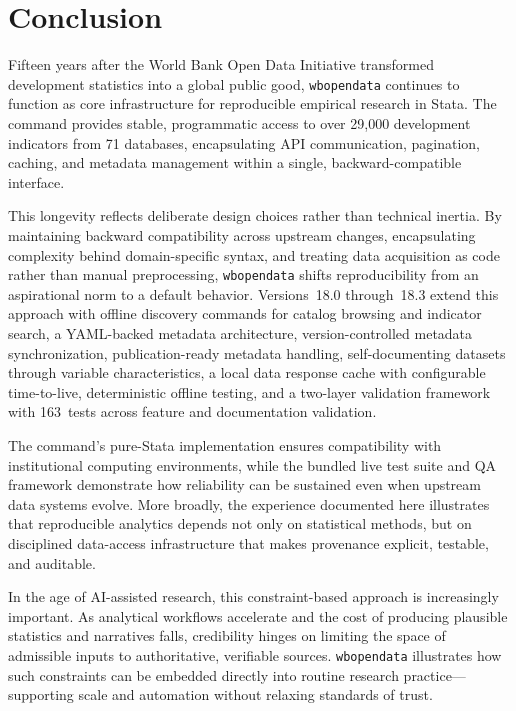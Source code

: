 \documentclass[bib]{statapress}
\begin{document}
\section{Conclusion}\label{sec:conclusion}

Fifteen years after the World Bank Open Data Initiative transformed development
statistics into a global public good, \texttt{wbopendata} continues to function
as core infrastructure for reproducible empirical research in Stata. The command
provides stable, programmatic access to over 29{,}000 development indicators from
71 databases, encapsulating API communication, pagination, caching, and metadata
management within a single, backward-compatible interface.

This longevity reflects deliberate design choices rather than technical inertia.
By maintaining backward compatibility across upstream changes, encapsulating
complexity behind domain-specific syntax, and treating data acquisition as code
rather than manual preprocessing, \texttt{wbopendata} shifts reproducibility from
an aspirational norm to a default behavior. Versions~18.0 through~18.3 extend this approach
with offline discovery commands for catalog browsing and indicator search,
a YAML-backed metadata architecture, version-controlled metadata synchronization,
publication-ready metadata handling, self-documenting datasets through variable
characteristics, a local data response cache with configurable time-to-live,
deterministic offline testing, and a two-layer validation framework
with 163~tests across feature and documentation validation.

The command’s pure-Stata implementation ensures compatibility with institutional
computing environments, while the bundled live test suite and QA framework
demonstrate how reliability can be sustained even when upstream data systems
evolve. More broadly, the experience documented here illustrates that reproducible
analytics depends not only on statistical methods, but on disciplined data-access
infrastructure that makes provenance explicit, testable, and auditable.

In the age of AI-assisted research, this constraint-based approach is increasingly
important. As analytical workflows accelerate and the cost of producing plausible
statistics and narratives falls, credibility hinges on limiting the space of
admissible inputs to authoritative, verifiable sources. \texttt{wbopendata}
illustrates how such constraints can be embedded directly into routine research
practice—supporting scale and automation without relaxing standards of trust.
\end{document}
